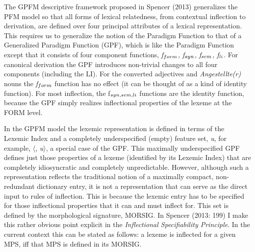\documentclass[output=paper,
modfonts
]{LSP/langsci}
\begin{document}
The GPFM descriptive framework proposed in Spencer (2013) generalizes the PFM model 
so that all forms of lexical relatedness, from contextual inflection to derivation, are defined over four principal attributes of a lexical representation. This requires us to generalize the notion of the Paradigm Function to that of a Generalized Paradigm Function  (GPF), which is like the Paradigm Function except that it consists of  four component functions, \textit{f$\sb{form}$, f$\sb{syn}$, f$\sb{sem}$, f$\sb{li}$}.  For canonical derivation the GPF introduces non-trivial changes to all four components (including the LI). For the converted adjectives and \emph{Angestellte(r)} nouns the \textit{f$\sb{form}$} function has no effect (it can be thought of as a kind of identity function). For most inflection,  the f$\sb{syn, sem, li}$ functions are the identity function, because the GPF simply realizes inflectional properties of the lexeme at the FORM level.  
   
In the GPFM model the lexemic representation is defined in terms of the Lexemic Index and a completely underspecified (empty) feature set, \emph{u}, for example, $\langle$, \emph{u}$\rangle$,  a special case of the GPF.  %
This maximally underspecified GPF defines just those properties of a lexeme (identified by its Lexemic Index) that are completely idiosyncratic and completely unpredictable. However, although such a representation reflects the traditional notion of a maximally compact, non-redundant  dictionary entry, it is not a representation that can serve as the direct input to rules of inflection. This is because the lexemic entry has to be specified for those inflectional properties that it can and must inflect for. This set is defined by the morphological signature, MORSIG. In Spencer (2013: 199) I make this rather obvious point explicit in the \emph{Inflectional Specifiability Principle}.  In the current context this can be stated as follows: a lexeme is inflected for a given MPS, iff that MPS is defined in its MORSIG.
\end{document}
